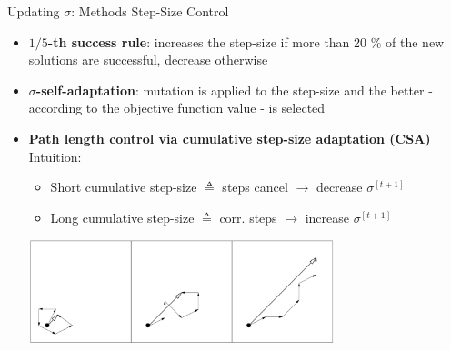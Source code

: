 \documentclass[11pt,compress,t,notes=noshow, xcolor=table]{beamer}
\begin{document}
%
%
%
%



\begin{vbframe}{Updating $\sigma$: Methods Step-Size Control}
\begin{itemize}
\setlength\itemsep{1.0em}
\item \textbf{$1/5$-th success rule}: increases the step-size if more than 20 \% of the new solutions are successful, decrease otherwise
\item \textbf{$\sigma$-self-adaptation}: mutation is applied to the step-size and the better - according to the objective function value - is selected
\item \textbf{Path length control via cumulative step-size adaptation (CSA)}\\ Intuition:
\begin{itemize}
    \item Short cumulative step-size $\triangleq$ steps cancel $\to$ decrease $\sigma^{[t+1]}$ 
    \item Long cumulative step-size $\triangleq$ corr. steps $\to$ increase $\sigma^{[t+1]}$ 
\end{itemize}
\vspace{0.3cm}
\begin{center}
\includegraphics[width=0.7\textwidth]{figure_man/cmaes/cumulative-step-size.png}
\end{center}

\end{itemize}
\end{vbframe}
\end{document}
